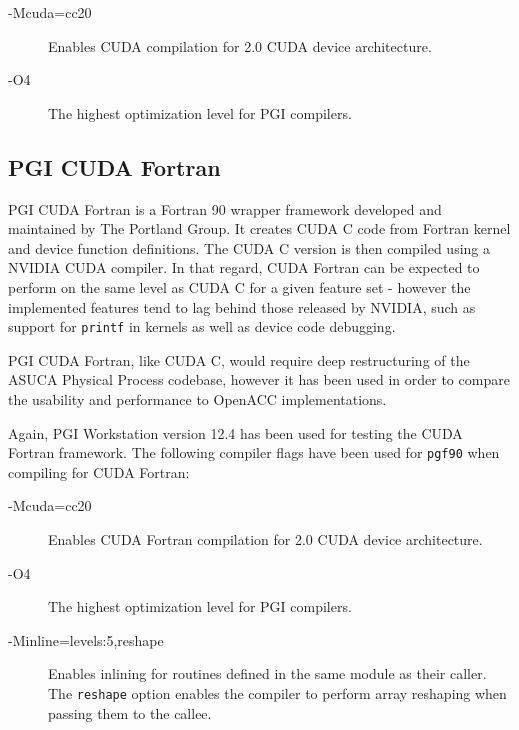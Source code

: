 \begin{description}
 \item[-Mcuda=cc20] Enables CUDA compilation for 2.0 CUDA device architecture.
 \item[-O4] The highest optimization level for PGI compilers.
\end{description}

\subsection{PGI CUDA Fortran} \label{sub:cudaFortran}

PGI CUDA Fortran is a Fortran 90 wrapper framework developed and maintained by The Portland Group. It creates CUDA C code from Fortran kernel and device function definitions. The CUDA C version is then compiled using a NVIDIA CUDA compiler. In that regard, CUDA Fortran can be expected to perform on the same level as CUDA C for a given feature set - however the implemented features tend to lag behind those released by NVIDIA, such as support for \verb|printf| in kernels as well as device code debugging. 

PGI CUDA Fortran, like CUDA C, would require deep restructuring of the ASUCA Physical Process codebase, however it has been used in order to compare the usability and performance to OpenACC implementations. 

Again, PGI Workstation version 12.4 has been used for testing the CUDA Fortran framework. The following compiler flags have been used for \verb|pgf90| when compiling for CUDA Fortran:

\begin{description}
 \item[-Mcuda=cc20] Enables CUDA Fortran compilation for 2.0 CUDA device architecture.
 \item[-O4] The highest optimization level for PGI compilers.
 \item[-Minline=levels:5,reshape] Enables inlining for routines defined in the same module as their caller. The \verb|reshape| option enables the compiler to perform array reshaping when passing them to the callee.
\end{description}



